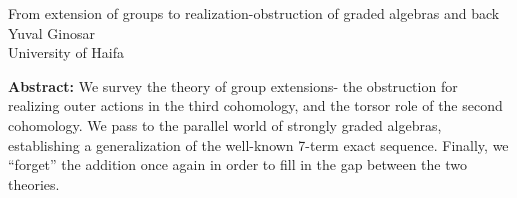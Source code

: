 \documentclass[12pt,a4paper]{article}
\begin{document}
\thispagestyle{empty} 
\begin{center}
{\large  From extension of groups to realization-obstruction of graded algebras and back}\\
\vspace*{.5cm}
Yuval Ginosar\\
University of Haifa\\
\end{center}
\vspace*{.8cm}

{\bf Abstract:} We survey the theory of group extensions- the obstruction for realizing outer actions in the third cohomology, and the torsor role of the second cohomology. We pass to the parallel world of strongly graded algebras, establishing a generalization of the well-known 7-term exact sequence. Finally, we ``forget'' the addition once again in order to fill in the gap between the two theories.
\end{document}

